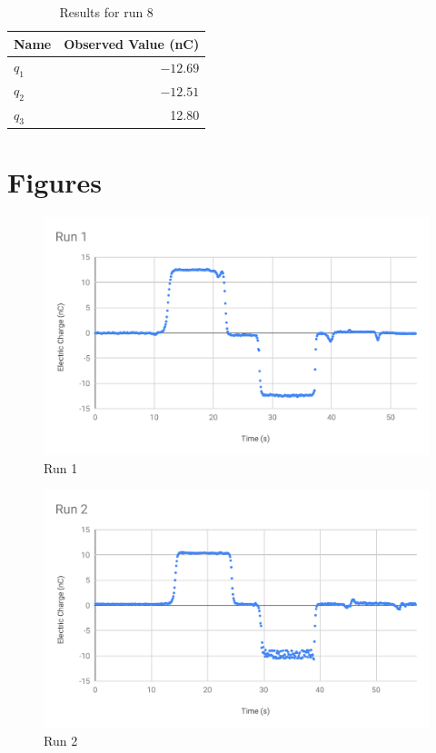 \begin{table}[ht]
	\centering
	\begin{tabular}{|l|r|}
		\hline
		Name & Observed Value (nC) \\
		\hline
		$q_{1}$ & $-12.69$ \\
		$q_{2}$ & $-12.51$ \\
		$q_{3}$ & 12.80 \\
		\hline
	\end{tabular}
	\caption{Results for run 8}
	\label{table_01_run_8}
\end{table}
\FloatBarrier
\newpage
\section{Figures}
\begin{figure}[ht]
	\centering
	\includegraphics[scale=0.74]{image/01-electro/Run1.pdf}
	\caption{Run 1}
	\label{figure.01.run.1}
\end{figure}
\begin{figure}[ht]
	\centering
	\includegraphics[scale=0.74]{image/01-electro/Run2.pdf}
	\caption{Run 2}
	\label{figure.01.run.2}
\end{figure}
